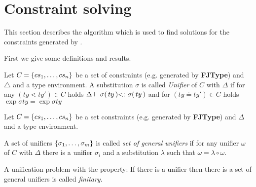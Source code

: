 \clearpage
\section{Constraint solving}
\label{sec:unify}

This section describes the \unify{} algorithm
which is used to find solutions for the constraints generated by \fjtype.

\color{red}
First we give some definitions and results.

\begin{definition}[Unifier]
  Let $C= \{ cs_1 , \ldots , cs_n \}$ be a set of constraints (e.g. generated by
  \textbf{FJType}) and $\mathtt{\triangle}$ and a type environment. A substitution $\sigma$
  is called \emph{Unifier} of $C$ with $\Delta$ if 
  for any $(ty \lessdot ty') \in C$ holds $\Delta \vdash \sigma(\,ty\,)
  \textrm{$<:$}\   \sigma(\,ty\,)$ and for $(ty \doteq ty') \in C$ holds $\exp{\sigma}{ty}
  =  \exp{\sigma}{ty}$
\end{definition}

\begin{definition}
  Let $C= \{ cs_1 , \ldots , cs_n \}$ be a set constraints (e.g. generated by
  \textbf{FJType}) and $\Delta$ and a type environment. 

  A set of unifiers $\{ \sigma_1 , \ldots , \sigma_m \}$ is called \emph{set of
    general unifiers} if for any unifier $\omega$ of $C$ with $\Delta$ there is
  a unifier $\sigma_i$ and a substitution $\lambda$ such that $\omega = \lambda
  \circ \omega$.
\end{definition}

\begin{definition}
A unification problem with the property: If there is a unifier then there is a set
of general unifiers is called \emph{finitary}.
\end{definition}



